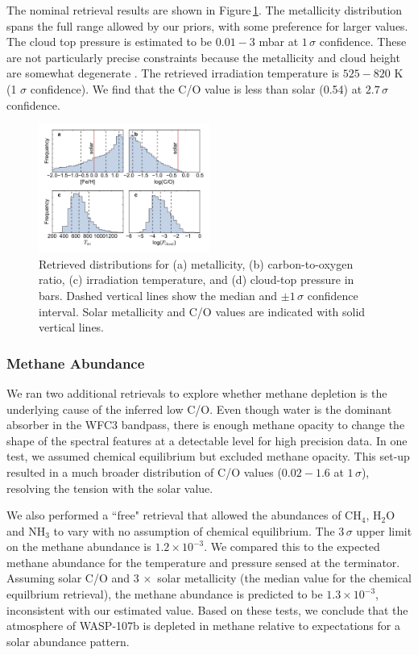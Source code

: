 \documentclass[twocolumn]{aastex61}
\begin{document}
The nominal retrieval results are shown in Figure\,\ref{fig:retrieval}.  The metallicity distribution spans the full range allowed by our priors, with some preference for larger values. The cloud top pressure is estimated to be $0.01 - 3$ mbar at $1\,\sigma$ confidence. These are not particularly precise constraints because the metallicity and cloud height are somewhat degenerate \citep{griffith14}.  The retrieved irradiation temperature is $525 - 820$ K (1 $\sigma$ confidence).  We find that the C/O value is less than solar (0.54) at $2.7\,\sigma$ confidence. 


\begin{figure}
\includegraphics[width = 0.5\textwidth]{Figures/retrieval.pdf}
\caption{Retrieved distributions for (a) metallicity, (b) carbon-to-oxygen ratio, (c) irradiation temperature, and (d) cloud-top pressure in bars. Dashed vertical lines show the median and $\pm1\,\sigma$ confidence interval. Solar metallicity and C/O values are indicated with solid vertical lines.}  \label{fig:retrieval}
\end{figure}

\subsubsection{Methane Abundance}
We ran two additional retrievals to explore whether methane depletion is the underlying cause of the inferred low C/O.  Even though water is the dominant absorber in the WFC3 bandpass, there is enough methane opacity to change the shape of the spectral features at a detectable level for high precision data.  In one test, we assumed chemical equilibrium but excluded methane opacity. This set-up resulted in a much broader distribution of C/O values ($0.02 - 1.6$ at $1\,\sigma$), resolving the tension with the solar value. 

We also performed a ``free" retrieval that allowed the abundances of CH$_4$, H$_2$O and NH$_3$ to vary with no assumption of chemical equilibrium. The $3\,\sigma$ upper limit on the methane abundance is $1.2\times10^{-3}$. We compared this to the expected methane abundance for the temperature and pressure sensed at the terminator.  Assuming  solar C/O and $3\,\times$ solar metallicity (the median value for the chemical equilbrium retrieval), the methane abundance is predicted to be $1.3\times10^{-3}$, inconsistent with our estimated value.  Based on these tests, we conclude that the atmosphere of WASP-107b is depleted in methane relative to expectations for a solar abundance pattern.
\end{document}
